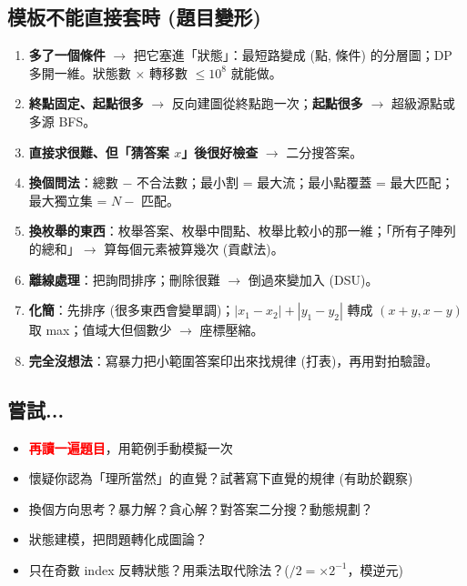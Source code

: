 \documentclass[portrait, 8pt, a4paper, oneside, twocolumn]{extarticle}
\begin{document}
\subsection{模板不能直接套時 (題目變形)}
\begin{enumerate}
    \item \textbf{多了一個條件} $\rightarrow$ 把它塞進「狀態」：最短路變成 (點, 條件) 的分層圖；DP 多開一維。狀態數 $\times$ 轉移數 $\le 10^8$ 就能做。
    \item \textbf{終點固定、起點很多} $\rightarrow$ 反向建圖從終點跑一次；\textbf{起點很多} $\rightarrow$ 超級源點或多源 BFS。
    \item \textbf{直接求很難、但「猜答案 $x$」後很好檢查} $\rightarrow$ 二分搜答案。
    \item \textbf{換個問法}：總數 $-$ 不合法數；最小割 = 最大流；最小點覆蓋 = 最大匹配；最大獨立集 = $N -$ 匹配。
    \item \textbf{換枚舉的東西}：枚舉答案、枚舉中間點、枚舉比較小的那一維；「所有子陣列的總和」$\rightarrow$ 算每個元素被算幾次 (貢獻法)。
    \item \textbf{離線處理}：把詢問排序；刪除很難 $\rightarrow$ 倒過來變加入 (DSU)。
    \item \textbf{化簡}：先排序 (很多東西會變單調)；$|x_1-x_2|+|y_1-y_2|$ 轉成 $(x+y, x-y)$ 取 max；值域大但個數少 $\rightarrow$ 座標壓縮。
    \item \textbf{完全沒想法}：寫暴力把小範圍答案印出來找規律 (打表)，再用對拍驗證。
\end{enumerate}

\subsection{嘗試...}
\begin{itemize}
    \item \textcolor{red}{\textbf{再讀一遍題目}}，用範例手動模擬一次
    \item 懷疑你認為「理所當然」的直覺？試著寫下直覺的規律 (有助於觀察)
    \item 換個方向思考？暴力解？貪心解？對答案二分搜？動態規劃？
    \item 狀態建模，把問題轉化成圖論？
    \item 只在奇數 index 反轉狀態？用乘法取代除法？($/2 = \times 2^{-1}$，模逆元)
\end{itemize}
\end{document}
